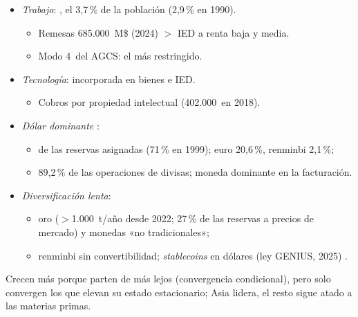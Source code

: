 \documentclass{article}
\begin{document}
\begin{columnas}
\begin{itemize}
\item \emph{Trabajo}: , el 3,7\,\% de la población (2,9\,\% en 1990).
  \begin{itemize}
  \item Remesas 685.000~M\$ (2024) $>$ IED a renta baja y media.
  \item Modo 4~del AGCS: el más restringido.
  \end{itemize}
\item \emph{Tecnología}: incorporada en bienes e IED.
  \begin{itemize}
  \item Cobros por propiedad intelectual  (402.000~en 2018).
  \end{itemize}
\end{itemize}

\begin{itemize}
\item \emph{Dólar dominante} :
  \begin{itemize}
  \item {} de las reservas asignadas (71\,\% en 1999); euro 20,6\,\%, renminbi 2,1\,\%;
  \item 89,2\,\% de las operaciones de divisas; moneda dominante en la facturación.
  \end{itemize}
\item \emph{Diversificación lenta}:
  \begin{itemize}
  \item oro ($>$1.000~t/año desde 2022; 27\,\% de las reservas a precios de mercado) y monedas «no tradicionales»;
  \item renminbi sin convertibilidad; \emph{stablecoins} en dólares (ley GENIUS, 2025) .
  \end{itemize}
\end{itemize}

\begin{ideaclave}
Crecen más porque parten de más lejos (convergencia condicional), pero solo convergen los que elevan su estado estacionario; Asia lidera, el resto sigue atado a las materias primas.
\end{ideaclave}


\end{columnas}
\end{document}
